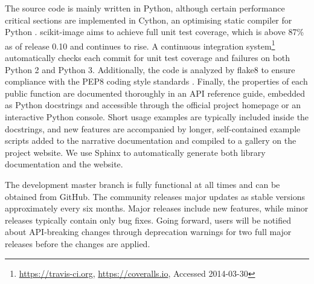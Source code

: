   The source code is mainly written in Python, although certain performance critical sections are implemented in Cython, an optimising static compiler for Python \citep{Cython}. scikit-image aims to achieve full unit test coverage, which is above 87\% as of release 0.10 and continues to rise. A continuous integration system\footnote{\url{https://travis-ci.org}, \url{https://coveralls.io}, Accessed 2014-03-30} automatically checks each commit for unit test coverage and failures on both Python 2 and Python 3. Additionally, the code is analyzed by flake8 \citep{flake8} to ensure compliance with the PEP8 coding style standards \citep{PEP8}. Finally, the properties of each public function are documented thoroughly in an API reference guide, embedded as Python docstrings and accessible through the official project homepage or an interactive Python console. Short usage examples are typically included inside the docstrings, and new features are accompanied by longer, self-contained example scripts added to the narrative documentation and compiled to a gallery on the project website. We use Sphinx \citep{Sphinx} to automatically generate both library documentation and the website.

  The development master branch is fully functional at all times and can be obtained from GitHub. The community releases major updates as stable versions approximately every six months. Major releases include new features, while minor releases typically contain only bug fixes. Going forward, users will be notified about API-breaking changes through deprecation warnings for two full major releases before the changes are applied.
